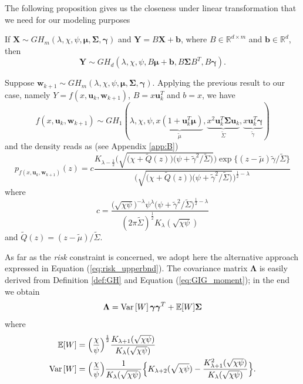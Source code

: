 The following proposition gives us the closeness under linear transformation that we need for our modeling purposes
\begin{proposition}
	If $\bm{X} \sim GH_m(\lambda,\chi,\psi,\bm{\mu},\bm{\Sigma},\bm{\gamma})$ and $\bm{Y}=B\bm{X}+\bm{b}$, where $B \in \mathbb{R}^{d\times m}$ and $\bm{b} \in \mathbb{R}^d$, then
	\[ \bm{Y} \sim GH_d(\lambda,\chi,\psi,B\bm{\mu}+\bm{b},B\bm{\Sigma}B^T,B\bm{\gamma}). \]
\end{proposition}
Suppose $\bm{w}_{k+1} \sim GH_m(\lambda,\chi,\psi,\bm{\mu},\bm{\Sigma},\bm{\gamma})$. Applying the previous result to our case, namely $Y = f(x,\bm{u}_k, \bm{w}_{k+1})$, $B=x\bm{u}_k^T$ and $b = x$, we have \[ f(x,\bm{u}_k,\bm{w}_{k+1}) \sim GH_1(\lambda,\chi,\psi,\underbrace{x(1+\bm{u}_k^T\bm{\mu})}_{\widetilde{\mu}},\underbrace{x^2\bm{u}_k^T\bm{\Sigma}\bm{u}_k}_{\widetilde{\Sigma}},\underbrace{x\bm{u}_k^T\bm{\gamma}}_{\widetilde{\gamma}}) \] and the density reads as (see Appendix  \ref{app:B})
\begin{equation}\label{eq:GHdensity}
\boxed{p_{f(x,\bm{u}_k, \bm{w}_{k+1})}(z) = c \frac{K_{\lambda-\frac{1}{2}}\Big(\sqrt{\big(\chi+\widetilde{Q}(z) \big)\big(\psi+\widetilde{\gamma}^2/\widetilde{\Sigma} \big)}\Big)\exp\big\{(z-\widetilde{\mu})\widetilde{\gamma}/\widetilde{\Sigma} \big\}}{\Big(\sqrt{\big(\chi+\widetilde{Q}(z) \big)\big(\psi+\widetilde{\gamma}^2/\widetilde{\Sigma} \big)}\Big)^{\frac{1}{2}-\lambda}}}
\end{equation}
where \[ c = \frac{\big(\sqrt{\chi\psi}\big)^{-\lambda}\psi^{\lambda}\big(\psi+\widetilde{\gamma}^2/\widetilde{\Sigma}\big)^{\frac{1}{2}-\lambda}}{(2\pi\widetilde{\Sigma})^{\frac{1}{2}}K_{\lambda}(\sqrt{\chi\psi})} \]
and $\widetilde{Q}(z)= (z-\widetilde{\mu})/\widetilde{\Sigma}$.


As far as the \textit{risk} constraint is concerned, we adopt here the alternative approach expressed in Equation (\ref{eq:risk_upperbnd}). The covariance matrix $\bm{\Lambda}$ is easily derived from Definition \ref{def:GH} and Equation (\ref{eq:GIG_moment}); in the end we obtain
\begin{equation}
\bm{\Lambda} = \operatorname{Var}\left[W\right]\bm{\gamma}\bm{\gamma}^T+\mathbb{E}[W]\bm{\Sigma}
\end{equation}
where
\begin{align*}
\mathbb{E}[W] & = \Big(\frac{\chi}{\psi}\Big)^{\frac{1}{2}}\frac{K_{\lambda+1}(\sqrt{\chi\psi})}{K_{\lambda}(\sqrt{\chi\psi})}\\
\operatorname{Var}\left[W\right] & = \Big(\frac{\chi}{\psi}\Big)\frac{1}{K_{\lambda}(\sqrt{\chi\psi})}\Big\{K_{\lambda+2}(\sqrt{\chi\psi})-\frac{K_{\lambda+1}^2(\sqrt{\chi\psi})}{K_{\lambda}(\sqrt{\chi\psi})} \Big\}.
\end{align*}



